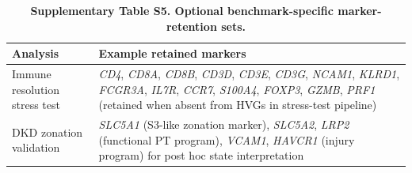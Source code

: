 \documentclass[11pt]{article}
\begin{document}
\begin{table}[htbp]
\centering
\caption{\textbf{Supplementary Table S5. Optional benchmark-specific marker-retention sets.}}
\label{tab:s5_marker_sets}
\renewcommand{\arraystretch}{1.2}
\begin{tabular}{p{} p{}}
\toprule
\textbf{Analysis} & \textbf{Example retained markers} \\
\midrule
Immune resolution stress test & \textit{CD4}, \textit{CD8A}, \textit{CD8B}, \textit{CD3D}, \textit{CD3E}, \textit{CD3G}, \textit{NCAM1}, \textit{KLRD1}, \textit{FCGR3A}, \textit{IL7R}, \textit{CCR7}, \textit{S100A4}, \textit{FOXP3}, \textit{GZMB}, \textit{PRF1} (retained when absent from HVGs in stress-test pipeline) \\
DKD zonation validation & \textit{SLC5A1} (S3-like zonation marker), \textit{SLC5A2}, \textit{LRP2} (functional PT program), \textit{VCAM1}, \textit{HAVCR1} (injury program) for post hoc state interpretation \\
\bottomrule
\end{tabular}
\end{table}
\end{document}
